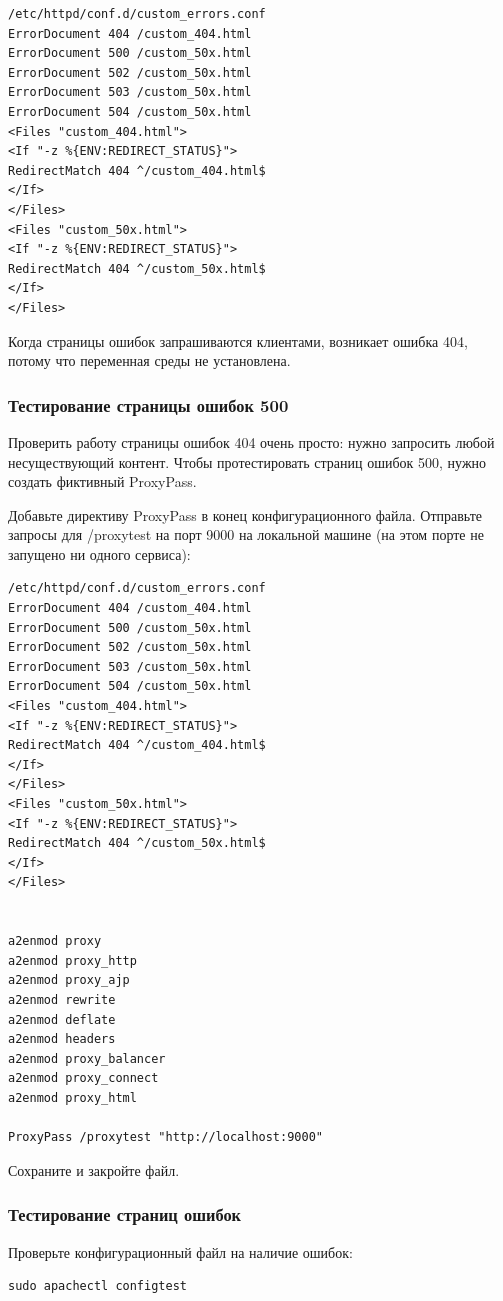 \documentclass[14pt, a4paper]{article}
\begin{document}
\begin{lstlisting}
/etc/httpd/conf.d/custom_errors.conf
ErrorDocument 404 /custom_404.html
ErrorDocument 500 /custom_50x.html
ErrorDocument 502 /custom_50x.html
ErrorDocument 503 /custom_50x.html
ErrorDocument 504 /custom_50x.html
<Files "custom_404.html">
<If "-z %{ENV:REDIRECT_STATUS}">
RedirectMatch 404 ^/custom_404.html$
</If>
</Files>
<Files "custom_50x.html">
<If "-z %{ENV:REDIRECT_STATUS}">
RedirectMatch 404 ^/custom_50x.html$
</If>
</Files>
\end{lstlisting}

Когда страницы ошибок запрашиваются клиентами, возникает ошибка 404, потому что переменная среды не установлена.

\subsubsection*{Тестирование страницы ошибок 500}

Проверить работу страницы ошибок 404 очень просто: нужно запросить любой несуществующий контент. 
Чтобы протестировать страниц ошибок 500, нужно создать фиктивный ProxyPass.

Добавьте директиву ProxyPass в конец конфигурационного файла. Отправьте запросы для 
/proxytest на порт 9000 на локальной машине (на этом порте не запущено ни одного сервиса):\pagebreak

\begin{lstlisting}
/etc/httpd/conf.d/custom_errors.conf
ErrorDocument 404 /custom_404.html
ErrorDocument 500 /custom_50x.html
ErrorDocument 502 /custom_50x.html
ErrorDocument 503 /custom_50x.html
ErrorDocument 504 /custom_50x.html
<Files "custom_404.html">
<If "-z %{ENV:REDIRECT_STATUS}">
RedirectMatch 404 ^/custom_404.html$
</If>
</Files>
<Files "custom_50x.html">
<If "-z %{ENV:REDIRECT_STATUS}">
RedirectMatch 404 ^/custom_50x.html$
</If>
</Files>


a2enmod proxy
a2enmod proxy_http
a2enmod proxy_ajp
a2enmod rewrite
a2enmod deflate
a2enmod headers
a2enmod proxy_balancer
a2enmod proxy_connect
a2enmod proxy_html

ProxyPass /proxytest "http://localhost:9000"
\end{lstlisting}

Сохраните и закройте файл.

\subsubsection*{Тестирование страниц ошибок}
Проверьте конфигурационный файл на наличие ошибок:
\begin{lstlisting}
sudo apachectl configtest
\end{lstlisting}
\end{document}
